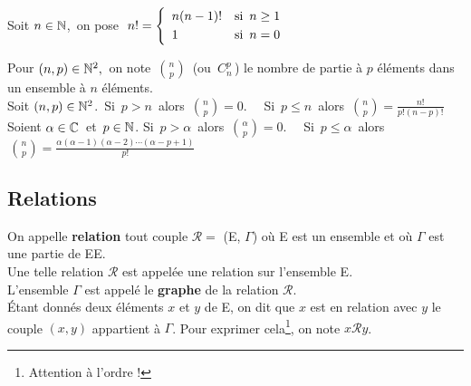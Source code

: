 \vspace{1.3cm}

\noindent Soit \(n\in \mathbb{N}\),\, on pose \(\;n!=\left\{
\begin{array}{ll}
    n(n-1)! & \text{si }\, n\geq 1\vspace{0.1cm}\\
    1 & \text{si }\, n=0
\end{array}
\right.\)

\vspace{1.2cm}

Pour \((n,p)\in \mathbb{N}^2,\,\) on note \(\,\displaystyle \binom{n}{p}\,\) (ou \(\,C_n^p\,\)) le nombre de partie à $p$ éléments dans un ensemble à $n$ éléments. \vspace{0.1cm}\\
Soit \((n,p)\in\mathbb{N}^2\).\, Si $\,p>n\,$ alors \(\displaystyle\, \binom{n}{p}=0.\quad\) Si $\,p\leq n\,$ alors \(\,\displaystyle \binom{n}{p}=\frac{n!}{p!(n-p)!}\)\vspace{1cm}\\
Soient $\alpha\in \mathbb{C}\,$ et $\,p\in \mathbb{N}$. Si $\,p>\alpha\,$ alors \(\displaystyle\, \binom{\alpha}{p}=0.\quad\) Si $\,p\leq \alpha\,$ alors \(\displaystyle\, \binom{n}{p}=\frac{\alpha(\alpha-1)(\alpha-2)\cdots(\alpha-p+1)}{p!} \) 


\vspace{1cm}

\subsection{Relations}

\vspace{0.5cm}

On appelle \textbf{relation} tout couple \(\mathcal{R}=\) (E, \(\Gamma\)) où E est un ensemble et où \(\Gamma\) est une partie de E\texttimes E.\\ 
Une telle relation \(\mathcal{R}\) est appelée une relation sur l'ensemble E.\\ 
L'ensemble \(\Gamma\) est appelé le \textbf{graphe} de la relation \(\mathcal{R}\).\vspace{0.1cm} \\ 
Étant donnés deux éléments $x$ et $y$ de E, on dit que $x$ est en relation avec $y$ \ssi le couple $(x,y)$ appartient à \(\Gamma\). Pour exprimer cela\footnote{Attention à l'ordre !}, on note \(x\mathcal{R}y\).

\vspace{1cm}

